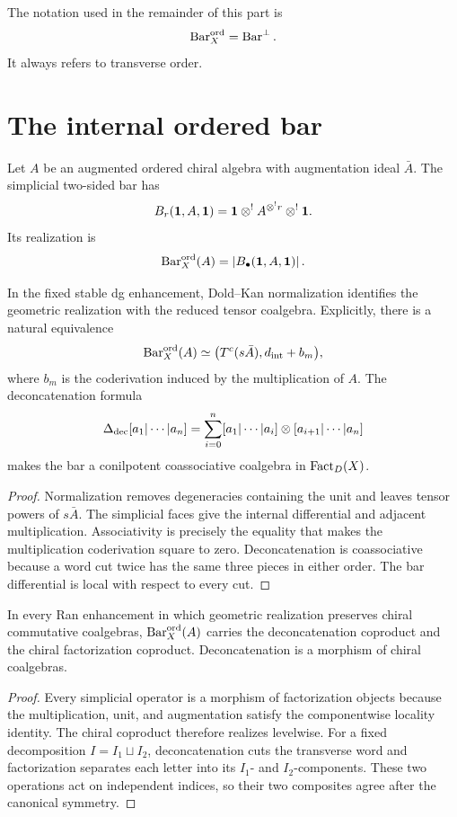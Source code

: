 The notation used in the remainder of this part is
\[
 \operatorname{Bar}_X^{\mathrm{ord}}=\operatorname{Bar}^{\perp}.
\]
It always refers to transverse order.

\chapter{The internal ordered bar}
Let $A$ be an augmented ordered chiral algebra with augmentation ideal $\bar A$. The simplicial two-sided bar has
\[
 B_r(\mathbf{1},A,\mathbf{1})=
 \mathbf{1}\otimes^! A^{\otimes^!r}\otimes^!\mathbf{1}.
\]
Its realization is
\[
 \operatorname{Bar}_X^{\mathrm{ord}}(A)=\left|B_\bullet(\mathbf{1},A,\mathbf{1})\right|.
\]

\begin{theorem}
In the fixed stable dg enhancement, Dold--Kan normalization identifies the geometric realization with the reduced tensor coalgebra. Explicitly, there is a natural equivalence
\[
 \operatorname{Bar}_X^{\mathrm{ord}}(A)
 \simeq
 \bigl(T^c(s\bar A),d_{\mathrm{int}}+b_m\bigr),
\]
where $b_m$ is the coderivation induced by the multiplication of $A$. The deconcatenation formula
\[
 \Delta_{\mathrm{dec}}[a_1|\cdots|a_n]
 =\sum_{i=0}^n[a_1|\cdots|a_i]\otimes[a_{i+1}|\cdots|a_n]
\]
makes the bar a conilpotent coassociative coalgebra in $\operatorname{Fact}_D(X)$.
\end{theorem}
\begin{proof}
Normalization removes degeneracies containing the unit and leaves tensor powers of $s\bar A$. The simplicial faces give the internal differential and adjacent multiplication. Associativity is precisely the equality that makes the multiplication coderivation square to zero. Deconcatenation is coassociative because a word cut twice has the same three pieces in either order. The bar differential is local with respect to every cut.
\end{proof}

\begin{theorem}
In every Ran enhancement in which geometric realization preserves chiral commutative coalgebras, $\operatorname{Bar}_X^{\mathrm{ord}}(A)$ carries the deconcatenation coproduct and the chiral factorization coproduct. Deconcatenation is a morphism of chiral coalgebras.
\end{theorem}
\begin{proof}
Every simplicial operator is a morphism of factorization objects because the multiplication, unit, and augmentation satisfy the componentwise locality identity. The chiral coproduct therefore realizes levelwise. For a fixed decomposition $I=I_1\sqcup I_2$, deconcatenation cuts the transverse word and factorization separates each letter into its $I_1$- and $I_2$-components. These two operations act on independent indices, so their two composites agree after the canonical symmetry.
\end{proof}

